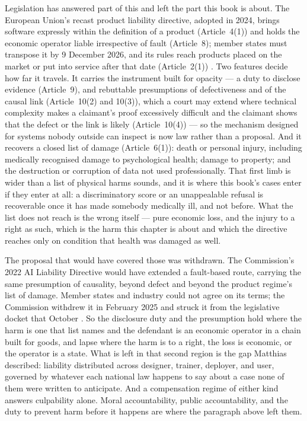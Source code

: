 Legislation has answered part of this and left the part this book is about. The European Union's recast product liability directive, adopted in 2024, brings software expressly within the definition of a product (Article~4(1)) and holds the economic operator liable irrespective of fault (Article~8); member states must transpose it by 9 December 2026, and its rules reach products placed on the market or put into service after that date (Article~2(1)) \autocite{eu2024productliability}. Two features decide how far it travels. It carries the instrument built for opacity — a duty to disclose evidence (Article~9), and rebuttable presumptions of defectiveness and of the causal link (Article~10(2) and 10(3)), which a court may extend where technical complexity makes a claimant's proof excessively difficult and the claimant shows that the defect or the link is likely (Article~10(4)) — so the mechanism designed for systems nobody outside can inspect is now law rather than a proposal. And it recovers a closed list of damage (Article~6(1)): death or personal injury, including medically recognised damage to psychological health; damage to property; and the destruction or corruption of data not used professionally. That first limb is wider than a list of physical harms sounds, and it is where this book's cases enter if they enter at all: a discriminatory score or an unappealable refusal is recoverable once it has made somebody medically ill, and not before. What the list does not reach is the wrong itself — pure economic loss, and the injury to a right as such, which is the harm this chapter is about and which the directive reaches only on condition that health was damaged as well.

The proposal that would have covered those was withdrawn. The Commission's 2022 AI Liability Directive would have extended a fault-based route, carrying the same presumption of causality, beyond defect and beyond the product regime's list of damage. Member states and industry could not agree on its terms; the Commission withdrew it in February 2025 and struck it from the legislative docket that October \autocite{europeancommission2022liability}. So the disclosure duty and the presumption hold where the harm is one that list names and the defendant is an economic operator in a chain built for goods, and lapse where the harm is to a right, the loss is economic, or the operator is a state. What is left in that second region is the gap Matthias described: liability distributed across designer, trainer, deployer, and user, governed by whatever each national law happens to say about a case none of them were written to anticipate. And a compensation regime of either kind answers culpability alone. Moral accountability, public accountability, and the duty to prevent harm before it happens are where the paragraph above left them.

